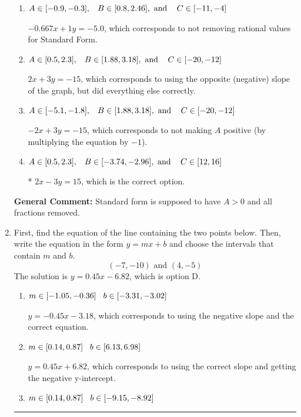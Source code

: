 \documentclass{extbook}[14pt]
\newcommand{\litem}[1]{\item #1

\rule{\textwidth}{0.4pt}}
\begin{document}
\begin{enumerate}
{\begin{enumerate}[label=\Alph*.]
 $-0.667x - 1y = 5.0$, which corresponds to using the opposite (negative) slope of the graph and not removing rational values.
\item \( A \in [-0.9, -0.3], \hspace{3mm} B \in [0.8, 2.46], \text{ and } \hspace{3mm} C \in [-11, -4] \)

 $-0.667x + 1y = -5.0$, which corresponds to not removing rational values for Standard Form.
\item \( A \in [0.5, 2.3], \hspace{3mm} B \in [1.88, 3.18], \text{ and } \hspace{3mm} C \in [-20, -12] \)

 $2x + 3y = -15$, which corresponds to using the opposite (negative) slope of the graph, but did everything else correctly.
\item \( A \in [-5.1, -1.8], \hspace{3mm} B \in [1.88, 3.18], \text{ and } \hspace{3mm} C \in [-20, -12] \)

 $-2x + 3y = -15$, which corresponds to not making $A$ positive (by multiplying the equation by $-1$).
\item \( A \in [0.5, 2.3], \hspace{3mm} B \in [-3.74, -2.96], \text{ and } \hspace{3mm} C \in [12, 16] \)

* $2x - 3y = 15$, which is the correct option.
\end{enumerate}

\textbf{General Comment:} Standard form is supposed to have $A > 0$ and all fractions removed.
}
\litem{
First, find the equation of the line containing the two points below. Then, write the equation in the form $ y=mx+b $ and choose the intervals that contain $m$ and $b$.
\[ (-7, -10) \text{ and } (4, -5) \]The solution is \( y = 0.45x -6.82 \), which is option D.\begin{enumerate}[label=\Alph*.]
\item \( m \in [-1.05, -0.36] \hspace*{3mm} b \in [-3.31, -3.02] \)

 $y = -0.45x -3.18$, which corresponds to using the negative slope and the correct equation.
\item \( m \in [0.14, 0.87] \hspace*{3mm} b \in [6.13, 6.98] \)

 $y = 0.45x + 6.82$, which corresponds to using the correct slope and getting the negative y-intercept.
\item \( m \in [0.14, 0.87] \hspace*{3mm} b \in [-9.15, -8.92] \)


\end{enumerate}}
\end{enumerate}
\end{document}
